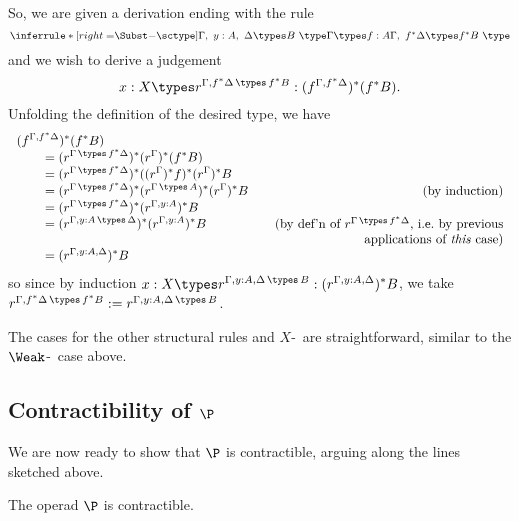 So, we are given a derivation ending with the rule
\[\inferrule*[right=$\Subst$-\sctype]{\Gamma,\ y:A,\ \Delta \types B\
\type \\ \Gamma \types f:A}{\Gamma,\ f^*\Delta \types f^*B\ \type}
\]
and we wish to derive a judgement
\[x:X \types r^{\Gamma,f^*\Delta \,\types\, f^*B} :
(f^{\Gamma,f^*\Delta})^*(f^*B).
\]
Unfolding the definition of the desired type, we have 
\[\begin{tabular}{ll}
\multicolumn{2}{l}{$\displaystyle (f^{\Gamma,f^*\Delta})^*(f^*B)$} \\
$\quad$ & $\displaystyle = (r^{\Gamma \,\types\, f^*\Delta})^*(r^\Gamma)^*(f^*B)$ \\
 & $\displaystyle = (r^{\Gamma \,\types\, f^*\Delta})^*((r^\Gamma)^*f)^*(r^\Gamma)^*B$ \\
 & $\displaystyle = (r^{\Gamma \,\types\, f^*\Delta})^*(r^{\Gamma \,\types\, A})^*(r^\Gamma)^*B \qquad$ \hfill (by induction) \\
 & $\displaystyle = (r^{\Gamma \,\types\, f^*\Delta})^*(r^{\Gamma,y:A})^*B$ \\
 & $\displaystyle = (r^{\Gamma,y:A \,\types\, \Delta})^*(r^{\Gamma,y:A})^*B \qquad \qquad \quad$ \hfill (by def'n of $r^{\Gamma \,\types\, f^*\Delta}$, i.e.\ by previous\\
 & \hfill applications of \emph{this} case)  \\
 & $\displaystyle = (r^{\Gamma,y:A,\Delta})^*B$ \\
\end{tabular}
\]
so since by induction $\displaystyle x:X \types r^{\Gamma,y:A,\Delta \,\types\, B}:(r^{\Gamma,y:A,\Delta})^*B$, we take $r^{\Gamma,f^*\Delta \,\types\, f^*B} := r^{\Gamma,y:A,\Delta \,\types\, B}$.

The cases for the other structural rules and $X$-\form\ are straightforward, similar to the $\Weak$-\sctype\ case above. \doubleqed

\subsection{Contractibility of \texorpdfstring{$\P$}{P\_ML\_Id}}

We are now ready to show that $\P$ is contractible, arguing along the lines sketched above.

\begin{thm}\label{theorem:p-is-contractible}The operad $\P$ is contractible.
\end{thm}


